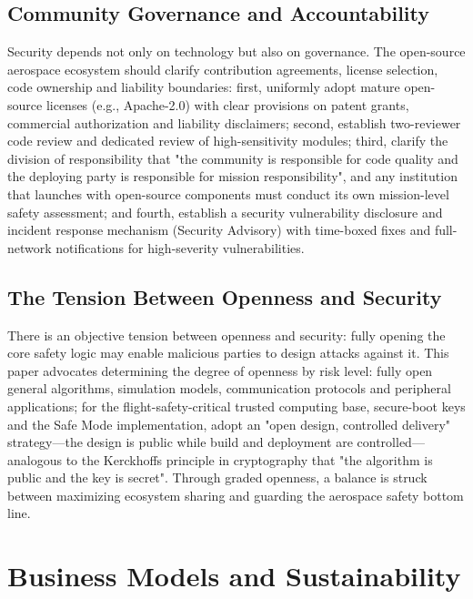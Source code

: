 \documentclass[11pt]{article}
\begin{document}
\subsection{Community Governance and Accountability}
Security depends not only on technology but also on governance. The open-source aerospace ecosystem should clarify contribution agreements, license selection, code ownership and liability boundaries: first, uniformly adopt mature open-source licenses (e.g., Apache-2.0) with clear provisions on patent grants, commercial authorization and liability disclaimers; second, establish two-reviewer code review and dedicated review of high-sensitivity modules; third, clarify the division of responsibility that "the community is responsible for code quality and the deploying party is responsible for mission responsibility", and any institution that launches with open-source components must conduct its own mission-level safety assessment; and fourth, establish a security vulnerability disclosure and incident response mechanism (Security Advisory) with time-boxed fixes and full-network notifications for high-severity vulnerabilities.

\subsection{The Tension Between Openness and Security}
There is an objective tension between openness and security: fully opening the core safety logic may enable malicious parties to design attacks against it. This paper advocates determining the degree of openness by risk level: fully open general algorithms, simulation models, communication protocols and peripheral applications; for the flight-safety-critical trusted computing base, secure-boot keys and the Safe Mode implementation, adopt an "open design, controlled delivery" strategy---the design is public while build and deployment are controlled---analogous to the Kerckhoffs principle in cryptography that "the algorithm is public and the key is secret". Through graded openness, a balance is struck between maximizing ecosystem sharing and guarding the aerospace safety bottom line.

\section{Business Models and Sustainability}
\end{document}
